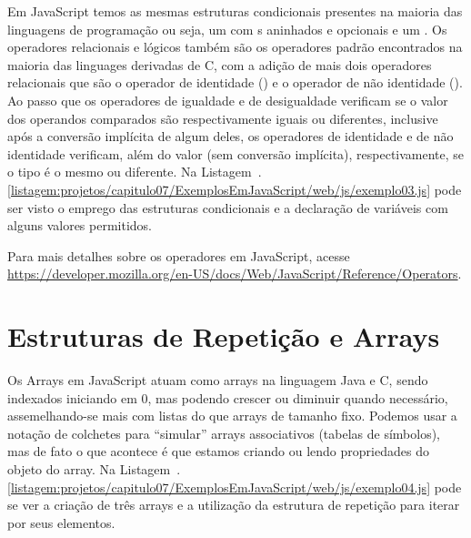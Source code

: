 Em JavaScript temos as mesmas estruturas condicionais presentes na maioria das linguagens de programação ou seja, um  com s aninhados e opcionais e um . Os operadores relacionais e lógicos também são os operadores padrão encontrados na maioria das linguages derivadas de C, com a adição de mais dois operadores relacionais que são o operador de identidade (\inlineJavaScriptCode{===}) e o operador de não identidade (\inlineJavaScriptCode{!==}). Ao passo que os operadores de igualdade e de desigualdade verificam se o valor dos operandos comparados são respectivamente iguais ou diferentes, inclusive após a conversão implícita de algum deles, os operadores de identidade e de não identidade verificam, além do valor (sem conversão implícita), respectivamente, se o tipo é o mesmo ou diferente. Na Listagem~\thechapter.\ref{listagem:projetos/capitulo07/ExemplosEmJavaScript/web/js/exemplo03.js} pode ser visto o emprego das estruturas condicionais e a declaração de variáveis com alguns valores permitidos.


\begin{saibaMais}
    Para mais detalhes sobre os operadores em JavaScript, acesse \url{https://developer.mozilla.org/en-US/docs/Web/JavaScript/Reference/Operators}.
\end{saibaMais}


\section{Estruturas de Repetição e Arrays}

Os Arrays em JavaScript atuam como arrays na linguagem Java e C, sendo indexados iniciando em 0, mas podendo crescer ou diminuir quando necessário, assemelhando-se mais com listas do que arrays de tamanho fixo. Podemos usar a notação de colchetes para ``simular'' arrays associativos (tabelas de símbolos), mas de fato o que acontece é que estamos criando ou lendo propriedades do objeto do array. Na Listagem~\thechapter.\ref{listagem:projetos/capitulo07/ExemplosEmJavaScript/web/js/exemplo04.js} pode se ver a criação de três arrays e a utilização da estrutura de repetição  para iterar por seus elementos.


